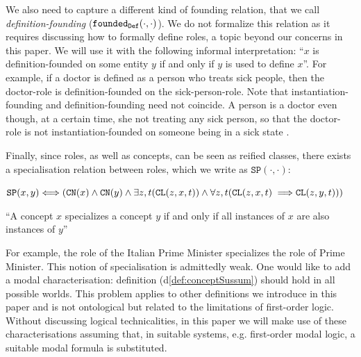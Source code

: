 \documentclass[sw]{iosart2x}
\newcommand{\bflist}{\begin{list}{}{\setlength{\topsep}{2mm}\setlength{\partopsep}{0mm}\setlength{\parsep}{0mm}\setlength{\leftmargin}{9mm}\setlength{\labelwidth}{8mm}}}
\newcommand{\eflist}{\end{list}}
\newcommand{\AxLabel}{\textrm{a}}
\newcommand{\DefLabel}{\textrm{d}}
\newcounter{cntax}
\newcommand{\myax}[1]{\refstepcounter{cntax}\begin{small}{\bf \AxLabel\thecntax\label{ax:#1}}\end{small}}
\newcounter{cntdef}
\newcommand{\mydf}[1]{\refstepcounter{cntdef}\begin{small}{\bf \DefLabel\thecntdef\label{def:#1}}\end{small}}
\newcommand{\mytext}[1]{``#1''}
\newcommand{\refdf}[1]{({\DefLabel}\ref{#1})}
\newcommand{\generalStyle}[1]{\texttt{#1}}
\newcommand{\biRel}[3]{\generalStyle{#1}(#2,#3)}
\newcommand{\uniRel}[2]{\generalStyle{#1}(#2)}
\newcommand{\biRelPar}[4]{\generalStyle{#1}_{\generalStyle{#4}}(#2,#3)}
\newcommand{\triRel}[4]{\generalStyle{#1}(#2,#3,#4)}
\newcommand{\myiff}{\Longleftrightarrow}
\newcommand{\myfi}{\hspace{0.9mm} \Longrightarrow}
\newcommand{\DOLCEConcept}[1]{\uniRel{{CN}}{#1}}
\newcommand{\DOLCECLby}[3]{\triRel{CL}{#1}{#2}{#3}}
\newcommand{\DOLCEConceptSubsum}[2]{\biRel{SP}{#1}{#2}}
\newcommand{\foundedDef}[2]{\biRelPar{\foundedTerm{passive}}{#1}{#2}{Def}}
\newcommand{\firstTimeKeyWord}[1]{\textit{#1}}
\newcommand{\foundedTerm}[1]{%
  \ifthenelse{\equal{#1}{passive}}{founded}{%
    \ifthenelse{\equal{#1}{verb}}{found}{%
      \ifthenelse{\equal{#1}{gerund}}{founding}{%
        ERROR!%
      }%
    }%
  }%
}
\newcommand{\TODO}[1]{{%
}}
\newcommand{\TODOinline}[1]{{%
}}
\begin{document}
We also need to capture a different kind of founding relation, that we call \firstTimeKeyWord{definition-founding} ($\foundedDef{\cdot}{\cdot}$). We do not formalize this relation as it requires discussing how to formally define roles, a topic beyond our concerns in this paper. We will use it with the following informal interpretation: \mytext{$x$ is definition-founded on some entity $y$ if and only if $y$ is used to define $x$}.
For example, if a doctor is defined as a person who treats sick people, then the doctor-role is definition-founded on the sick-person-role.\TODO{S: userei "sick person" per evitare che la relazione founded sembri simmetrica: a doctor is defined as a person who treats people which are in a sick state [FC:Ok]}  %
Note that instantiation-founding and definition-founding need not  coincide. A person is a doctor even though, at a certain time, she not treating any sick person, so that the doctor-role is not instantiation-founded on someone being in a sick state\TODO{S: on someone being in a sick state}.

Finally, since roles, as well as concepts, can be seen as reified classes, there exists a specialisation relation between roles, which we write as $\DOLCEConceptSubsum{\cdot}{\cdot}$:
\bflist
\item[\mydf{conceptSussum}] $ \DOLCEConceptSubsum{x}{y} \myiff (\DOLCEConcept{x} \land \DOLCEConcept{y} \land \exists z,t (\DOLCECLby{z}{x}{t}) \land \forall z,t (\DOLCECLby{z}{x}{t} \myfi \DOLCECLby{z}{y}{t}) )$%
\item \mytext{A concept $x$ specializes a concept $y$ if and only if all instances of $x$ are also instances of $y$} 
\eflist
For example, the role of the Italian Prime Minister specializes the role of Prime Minister.
{This notion of specialisation is admittedly weak. One would like to add a modal characterisation: definition \refdf{def:conceptSussum} should hold in all possible worlds. This problem applies to other definitions we introduce in this paper %
and is not ontological but related to the limitations of first-order logic. Without discussing logical technicalities, in this paper we will make use of these characterisations assuming that, in suitable systems, e.g. first-order modal logic, a suitable modal formula is substituted.}
\end{document}
